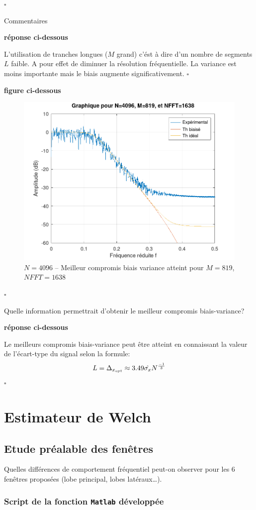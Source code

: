 \documentclass{article}
\newcommand{\debutrep}[1]{\color{blue}\begin{center} \hrulefill \textbf{ #1 } \hrulefill \end{center} }
\newcommand{\finrep}{\vspace*{5mm}\hfill $\square$\color{black}\vspace*{5mm}}
\begin{document}
\finrep

Commentaires
\debutrep{réponse ci-dessous}
L'utilisation de tranches longues ($M$ grand) c'ést à dire d'un nombre de segments $L$ faible. A pour effet de diminuer la résolution fréquentielle. La variance est moins importante mais le biais augmente significativement.
\finrep

\debutrep{figure ci-dessous}
\begin{figure}[H]
\centering
\includegraphics[width=0.75\columnwidth]{Variation-M-best.png}
\caption{$N=4096$ -- Meilleur compromis biais variance atteint pour $M = 819$, $NFFT = 1638$}
\end{figure}

\finrep

Quelle information permettrait d'obtenir le meilleur compromis biais-variance? 

\debutrep{réponse ci-dessous}
Le meilleurs compromis biais-variance peut être atteint en connaissant la valeur de l'écart-type du signal selon la formule:
\[
L = \Delta_{x_{opt}} \approx 3.49 \hat{\sigma_x} N ^ {-1\over3}
\]
\finrep
\clearpage
\section{Estimateur de Welch}

\subsection{Etude préalable des fenêtres}

Quelles différences de comportement fréquentiel peut-on observer pour les 6 fenêtres proposées (lobe principal, lobes latéraux\ldots).

\subsubsection{Script de la fonction {\tt Matlab} développée}
\end{document}
